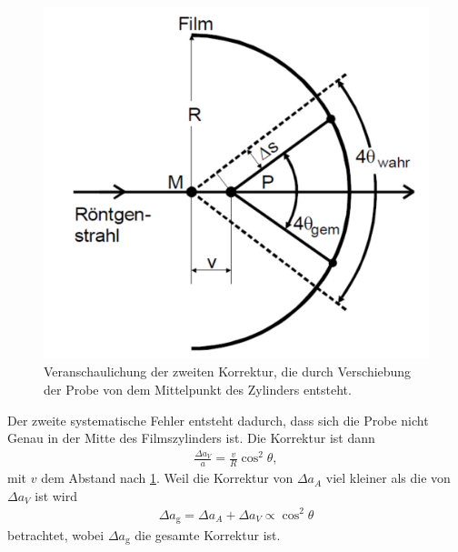 \begin{figure}[h!]
	\centering
	\includegraphics[scale=0.4]{../Grafiken/ZweiteKorrektur.pdf}
	\caption{Veranschaulichung der zweiten Korrektur, die durch Verschiebung der Probe von dem Mittelpunkt des Zylinders entsteht.\cite{V41}}\label{fig:ZweiteKorrektur}
\end{figure}
\FloatBarrier
Der zweite systematische Fehler entsteht dadurch, dass sich die Probe nicht Genau in der Mitte des Filmszylinders ist. Die Korrektur ist dann
\begin{align}
	\frac{\Delta a_V}{a}=\frac{v}{R}\cos^2\theta,
\end{align}
mit $v$ dem Abstand nach \cref{fig:ZweiteKorrektur}. Weil die Korrektur von $\Delta a_A$ viel kleiner als die von $\Delta a_V$ ist wird 
\begin{align}
	\Delta a_\text{g}=\Delta a_A+ \Delta a_V \propto \cos^2\theta
\end{align}
betrachtet, wobei $\Delta a_\text{g}$ die gesamte Korrektur ist.